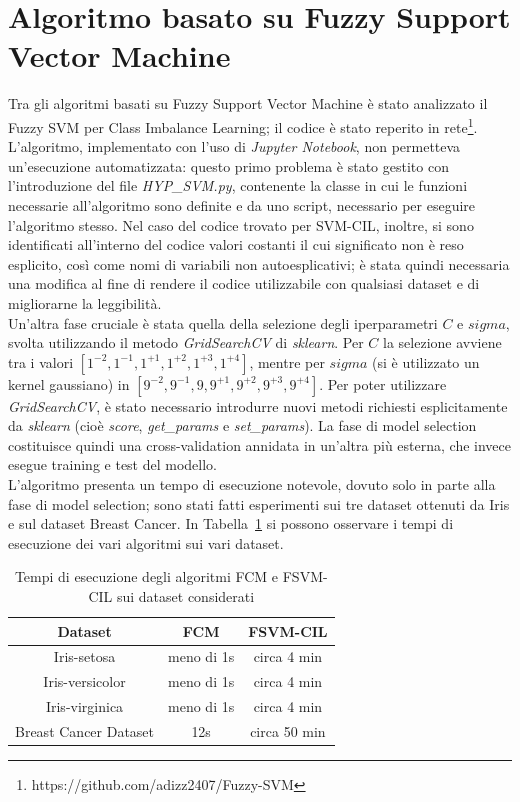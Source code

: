 \documentclass[oneside, openany]{book}
\begin{document}
	\section{Algoritmo basato su Fuzzy Support Vector Machine}
	Tra gli algoritmi basati su Fuzzy Support Vector Machine è stato analizzato il Fuzzy SVM per Class Imbalance Learning; il codice è stato reperito in rete\footnote{https://github.com/adizz2407/Fuzzy-SVM}. L'algoritmo, implementato con l'uso di \textit{Jupyter Notebook}, non permetteva un'esecuzione automatizzata: questo primo problema è stato gestito con l'introduzione del file \textit{HYP\_SVM.py}, contenente la classe in cui le funzioni necessarie all'algoritmo sono definite e da uno script, necessario per eseguire l'algoritmo stesso. Nel caso del codice trovato per SVM-CIL, inoltre, si sono identificati all'interno del codice valori costanti il cui significato non è reso esplicito, così come nomi di variabili non autoesplicativi; è stata quindi necessaria una modifica al fine di rendere il codice utilizzabile con qualsiasi dataset e di migliorarne la leggibilità.\\ Un'altra fase cruciale è stata quella della selezione degli iperparametri $C$ e $sigma$, svolta utilizzando il metodo \textit{GridSearchCV} di \textit{sklearn}. Per $C$ la selezione avviene tra i valori $[1^{-2}, 1^{-1}, 1^{+1}, 1^{+2}, 1^{+3}, 1^{+4}]$, mentre per $sigma$ (si è utilizzato un kernel gaussiano) in $[9^{-2}, 9^{-1}, 9, 9^{+1}, 9^{+2}, 9^{+3}, 9^{+4}]$. Per poter utilizzare \textit{GridSearchCV}, è stato necessario introdurre nuovi metodi richiesti esplicitamente da \textit{sklearn} (cioè \textit{score}, \textit{get\_params} e \textit{set\_params}). La fase di model selection costituisce quindi una cross-validation annidata in un'altra più esterna, che invece esegue training e test del modello.\\
	L'algoritmo presenta un tempo di esecuzione notevole, dovuto solo in parte alla fase di model selection; sono stati fatti esperimenti sui tre dataset ottenuti da Iris e sul dataset Breast Cancer. In Tabella~\ref{tab:tempi} si possono osservare i tempi di esecuzione dei vari algoritmi sui vari dataset.
	
		
	\begin{table}[h]
		\caption{Tempi di esecuzione degli algoritmi FCM e FSVM-CIL sui dataset considerati}
		\begin{center}\begin{tabular}{ |c|c|c| } 
				\hline
				\textbf{Dataset} & \textbf{FCM} & \textbf{FSVM-CIL}\\
				\hline
				Iris-setosa & meno di 1s & circa 4 min\\
				\hline
				Iris-versicolor & meno di 1s & circa 4 min\\
				\hline
				Iris-virginica & meno di 1s & circa 4 min\\
				\hline
				Breast Cancer Dataset &  12s & circa 50 min\\
				\hline									
			\end{tabular}
		\end{center}
		\label{tab:tempi}	
	\end{table}
	
\end{document}
